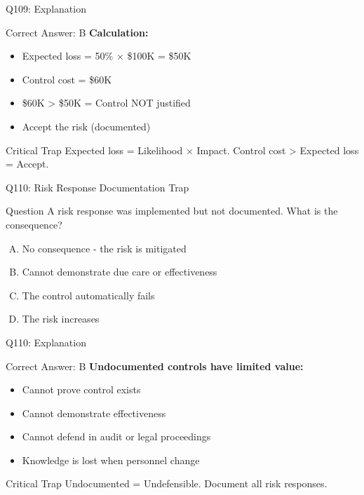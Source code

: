\documentclass{beamer}
\begin{document}
	\begin{frame}{Q109: Explanation}
		\begin{block}{Correct Answer: B}
			\textbf{Calculation:}
			\begin{itemize}
				\item Expected loss = 50\% × \$100K = \$50K
				\item Control cost = \$60K
				\item \$60K > \$50K = Control NOT justified
				\item Accept the risk (documented)
			\end{itemize}
		\end{block}
		\begin{alertblock}{Critical Trap}
			Expected loss = Likelihood × Impact.
			Control cost > Expected loss = Accept.
		\end{alertblock}
	\end{frame}
	
	\begin{frame}{Q110: Risk Response Documentation Trap}
		\begin{block}{Question}
			A risk response was implemented but not documented. What is the consequence?
		\end{block}
		\begin{enumerate}[(A)]
			\item No consequence - the risk is mitigated
			\item Cannot demonstrate due care or effectiveness
			\item The control automatically fails
			\item The risk increases
		\end{enumerate}
	\end{frame}
	
	\begin{frame}{Q110: Explanation}
		\begin{block}{Correct Answer: B}
			\textbf{Undocumented controls have limited value:}
			\begin{itemize}
				\item Cannot prove control exists
				\item Cannot demonstrate effectiveness
				\item Cannot defend in audit or legal proceedings
				\item Knowledge is lost when personnel change
			\end{itemize}
		\end{block}
		\begin{alertblock}{Critical Trap}
			Undocumented = Undefensible.
			Document all risk responses.
		\end{alertblock}
	\end{frame}
	
\end{document}
